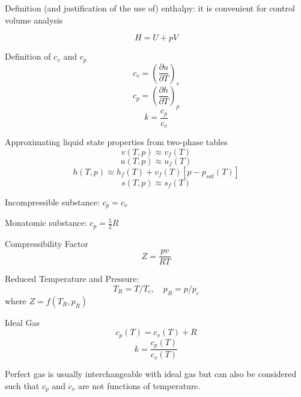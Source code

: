 \documentclass[paper=letter, fontsize=11pt]{scrartcl}
\numberwithin{equation}{section}        %
\numberwithin{figure}{section}          %
\numberwithin{table}{section}               %
\begin{document}
Definition (and justification of the use of) enthalpy: it is convenient for control volume analysis

\begin{equation}
    H=U+pV
\end{equation}

Definition of $c_v$ and $c_p$ 
\begin{equation}
    c_v = \left(\frac{\partial u}{\partial T}\right)_v
\end{equation}
\begin{equation}
    c_p = \left(\frac{\partial h}{\partial T}\right)_p
\end{equation}
\begin{equation}
    k = \frac{c_p}{c_v}
\end{equation}

Approximating liquid state properties from two-phase tables
\begin{equation}
    v(T,p)\approx v_f(T)
\end{equation}
\begin{equation}
    u(T,p)\approx u_f(T)
\end{equation}
\begin{equation}
    h(T,p)\approx h_f(T) + v_f(T)[p-p_{sat}(T)]
\end{equation}
\begin{equation}
    s(T,p)\approx s_f(T)
\end{equation}

Incompressible substance: $c_p=c_v$

Monatomic substance: $c_p=\frac{5}{2}R$

Compressibility Factor
\begin{equation}
    Z = \frac{pv}{RT}
\end{equation}

Reduced Temperature and Pressure:
\begin{equation}
    T_R = T/T_c,\quad p_R = p/p_c
\end{equation}
where $Z=f(T_R,p_R)$

Ideal Gas
\begin{equation}
    c_p(T) = c_v(T)+R
\end{equation}
\begin{equation}
    k = \frac{c_p(T)}{c_v(T)}
\end{equation}

Perfect gas is usually interchangeable with ideal gas but can also be considered such that $c_p$ and $c_v$ are not functions of temperature.
\end{document}

